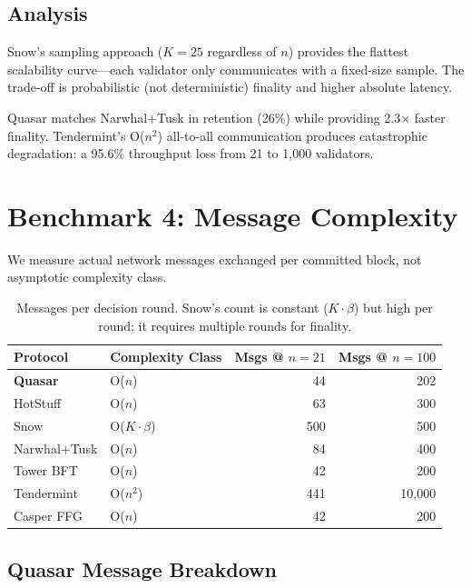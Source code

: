 \documentclass[11pt]{article}
\begin{document}
\subsection{Analysis}

Snow's sampling approach ($K=25$ regardless of $n$) provides the flattest scalability
curve---each validator only communicates with a fixed-size sample. The trade-off is
probabilistic (not deterministic) finality and higher absolute latency.

Quasar matches Narwhal+Tusk in retention (26\%) while providing 2.3$\times$ faster
finality. Tendermint's O($n^2$) all-to-all communication produces catastrophic
degradation: a 95.6\% throughput loss from 21 to 1{,}000 validators.

\section{Benchmark 4: Message Complexity}
\label{sec:messages}

We measure actual network messages exchanged per committed block, not asymptotic
complexity class.

\begin{table}[h]
\centering
\begin{tabular}{@{}llrr@{}}
\toprule
\textbf{Protocol} & \textbf{Complexity Class} & \textbf{Msgs @ $n=21$} & \textbf{Msgs @ $n=100$} \\
\midrule
\textbf{Quasar}   & O($n$)   & 44        & 202 \\
HotStuff          & O($n$)   & 63        & 300 \\
Snow              & O($K \cdot \beta$) & 500 & 500 \\
Narwhal+Tusk      & O($n$)   & 84        & 400 \\
Tower BFT         & O($n$)   & 42        & 200 \\
Tendermint        & O($n^2$) & 441       & 10{,}000 \\
Casper FFG        & O($n$)   & 42        & 200 \\
\bottomrule
\end{tabular}
\caption{Messages per decision round. Snow's count is constant ($K \cdot \beta$) but high
per round; it requires multiple rounds for finality.}
\label{tab:messages}
\end{table}

\subsection{Quasar Message Breakdown}
\end{document}
